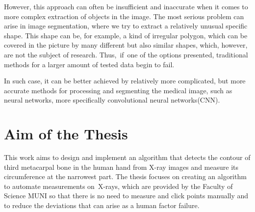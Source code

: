 However, this approach can often be insufficient and inaccurate when it comes to more complex extraction of objects in the image. The most serious problem can arise in image segmentation, where we try to extract a relatively unusual specific shape. This shape can be, for example, a kind of irregular polygon, which can be covered in the picture by many different but also similar shapes, which, however, are not the subject of research. Thus,~if~one of the options presented, traditional methods for a larger amount of tested data begin to fail. 

In such case, it can be better achieved by relatively more complicated, but more accurate methods for processing and segmenting the medical image, such as neural networks, more specifically convolutional neural networks(CNN). 

\section{Aim of the Thesis} 
This work aims to design and implement an algorithm that detects the contour of third metacarpal bone in the human hand from X-ray images and measure its circumference at the narrowest part. The thesis focuses on creating an algorithm to automate measurements on~X-rays, which are provided by the Faculty of Science MUNI so that there is no need to measure and click points manually and to reduce the deviations that can arise as a human factor failure.

